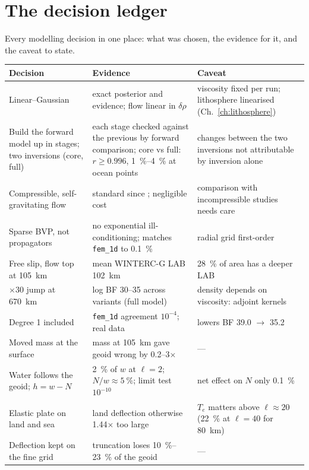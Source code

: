 \chapter{The decision ledger}
\label{ch:ledger}

Every modelling decision in one place: what was chosen, the evidence for it, and the caveat to state.

\begin{center}
\small
\begin{longtable}{p{}p{}p{}}
\toprule
Decision & Evidence & Caveat\\
\midrule
\endhead
Linear--Gaussian & exact posterior and evidence; flow linear in $\delta\rho$ & viscosity fixed per run; lithosphere linearised (Ch.~\ref{ch:lithosphere})\\
Build the forward model up in stages; two inversions (core, full) & each stage checked against the previous by forward comparison; core vs full: $r\ge0.996$, \qtyrange{1}{4}{\percent} at ocean points & changes between the two inversions not attributable by inversion alone\\
Compressible, self-gravitating flow & standard since \citet{corrieu_mantle_1995}; negligible cost & comparison with incompressible studies needs care\\
Sparse BVP, not propagators & no exponential ill-conditioning; matches \texttt{fem\_1d} to \qty{0.1}{\percent} & radial grid first-order\\
Free slip, flow top at \qty{105}{km} & mean WINTERC-G LAB \qty{102}{km} & \qty{28}{\percent} of area has a deeper LAB\\
$\times30$ jump at \qty{670}{km} & log BF 30--35 across variants (full model) & density depends on viscosity: adjoint kernels\\
Degree 1 included & \texttt{fem\_1d} agreement $10^{-4}$; real data & lowers BF 39.0 $\to$ 35.2\\
Moved mass at the surface & mass at \qty{105}{km} gave geoid wrong by 0.2--3$\times$ & ---\\
Water follows the geoid; $h = w - N$ & \qty{2}{\percent} of $w$ at $\ell=2$; $N/w\approx\qty{5}{\percent}$; limit test $10^{-10}$ & net effect on $N$ only \qty{0.1}{\percent}\\
Elastic plate on land and sea & land deflection otherwise 1.44$\times$ too large & $T_e$ matters above $\ell\approx20$ (\qty{22}{\percent} at $\ell=40$ for \qty{80}{km})\\
Deflection kept on the fine grid & truncation loses \qtyrange{10}{23}{\percent} of the geoid & ---\\

\end{longtable}
\end{center}
